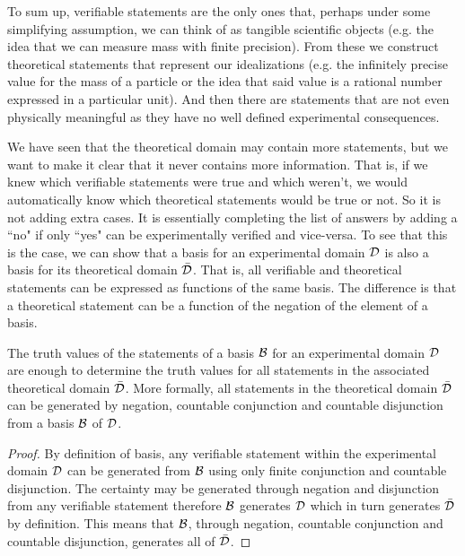	To sum up, verifiable statements are the only ones that, perhaps under some simplifying assumption, we can think of as tangible scientific objects (e.g. the idea that we can measure mass with finite precision). From these we construct theoretical statements that represent our idealizations (e.g. the infinitely precise value for the mass of a particle or the idea that said value is a rational number expressed in a particular unit). And then there are statements that are not even physically meaningful as they have no well defined experimental consequences.
	
	We have seen that the theoretical domain may contain more statements, but we want to make it clear that it never contains more information. That is, if we knew which verifiable statements were true and which weren't, we would automatically know which theoretical statements would be true or not. So it is not adding extra cases. It is essentially completing the list of answers by adding a ``no" if only ``yes" can be experimentally verified and vice-versa. To see that this is the case, we can show that a basis for an experimental domain $\mathcal{D}$ is also a basis for its theoretical domain $\bar{\mathcal{D}}$. That is, all verifiable and theoretical statements can be expressed as functions of the same basis. The difference is that a theoretical statement can be a function of the negation of the element of a basis.
	
	\begin{mathSection}
		\begin{prop}\label{pm-vs-basisForTheoreticalDomain}
			The truth values of the statements of a basis $\mathcal{B}$ for an experimental domain $\mathcal{D}$ are enough to determine the truth values for all statements in the associated theoretical domain $\bar{\mathcal{D}}$. More formally, all statements in the theoretical domain $\bar{\mathcal{D}}$ can be generated by negation, countable conjunction and countable disjunction from a basis $\mathcal{B}$ of $\mathcal{D}$.
		\end{prop}
		
		\begin{proof}
			By definition of basis, any verifiable statement within the experimental domain $\mathcal{D}$ can be generated from $\mathcal{B}$ using only finite conjunction and countable disjunction. The certainty may be generated through negation and disjunction from any verifiable statement therefore $\mathcal{B}$ generates $\mathcal{D}$ which in turn generates $\bar{\mathcal{D}}$ by definition. This means that $\mathcal{B}$, through negation, countable conjunction and countable disjunction, generates all of $\bar{\mathcal{D}}$.
		\end{proof}
	\end{mathSection}
	
